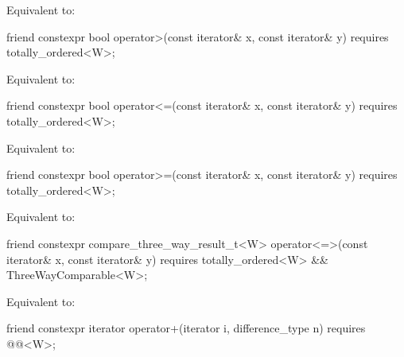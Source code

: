 \begin{itemdescr}
\pnum
\effects Equivalent to: 
\end{itemdescr}

\begin{itemdecl}
friend constexpr bool operator>(const iterator& x, const iterator& y)
  requires totally_ordered<W>;
\end{itemdecl}

\begin{itemdescr}
\pnum
\effects Equivalent to: 
\end{itemdescr}

\begin{itemdecl}
friend constexpr bool operator<=(const iterator& x, const iterator& y)
  requires totally_ordered<W>;
\end{itemdecl}

\begin{itemdescr}
\pnum
\effects Equivalent to: 
\end{itemdescr}

\begin{itemdecl}
friend constexpr bool operator>=(const iterator& x, const iterator& y)
  requires totally_ordered<W>;
\end{itemdecl}

\begin{itemdescr}
\pnum
\effects Equivalent to: 
\end{itemdescr}

\begin{itemdecl}
friend constexpr compare_three_way_result_t<W>
  operator<=>(const iterator& x, const iterator& y)
    requires totally_ordered<W> && ThreeWayComparable<W>;
\end{itemdecl}

\begin{itemdescr}
\pnum
\effects
Equivalent to: 
\end{itemdescr}

\begin{itemdecl}
friend constexpr iterator operator+(iterator i, difference_type n)
  requires @@<W>;
\end{itemdecl}

